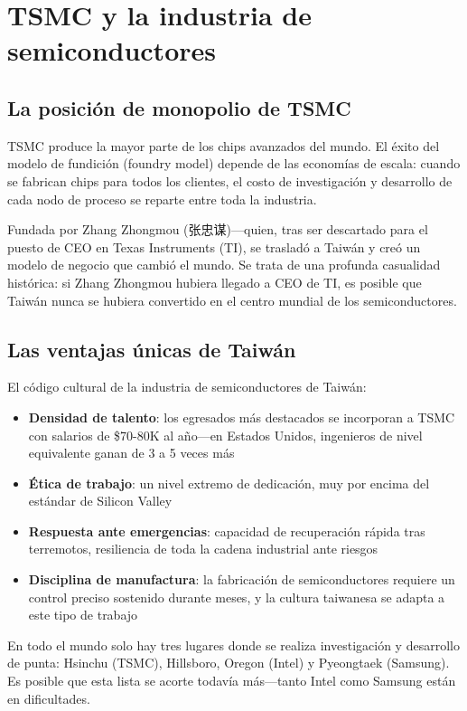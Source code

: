 \section{TSMC y la industria de semiconductores}

\subsection{La posición de monopolio de TSMC}

TSMC produce la mayor parte de los chips avanzados del mundo. El éxito del modelo de fundición (foundry model) depende de las economías de escala: cuando se fabrican chips para todos los clientes, el costo de investigación y desarrollo de cada nodo de proceso se reparte entre toda la industria.

Fundada por Zhang Zhongmou (张忠谋)---quien, tras ser descartado para el puesto de CEO en Texas Instruments (TI), se trasladó a Taiwán y creó un modelo de negocio que cambió el mundo. Se trata de una profunda casualidad histórica: si Zhang Zhongmou hubiera llegado a CEO de TI, es posible que Taiwán nunca se hubiera convertido en el centro mundial de los semiconductores.

\subsection{Las ventajas únicas de Taiwán}

El código cultural de la industria de semiconductores de Taiwán:

\begin{itemize}
    \item \textbf{Densidad de talento}: los egresados más destacados se incorporan a TSMC con salarios de \$70-80K al año---en Estados Unidos, ingenieros de nivel equivalente ganan de 3 a 5 veces más
    \item \textbf{Ética de trabajo}: un nivel extremo de dedicación, muy por encima del estándar de Silicon Valley
    \item \textbf{Respuesta ante emergencias}: capacidad de recuperación rápida tras terremotos, resiliencia de toda la cadena industrial ante riesgos
    \item \textbf{Disciplina de manufactura}: la fabricación de semiconductores requiere un control preciso sostenido durante meses, y la cultura taiwanesa se adapta a este tipo de trabajo
\end{itemize}

En todo el mundo solo hay tres lugares donde se realiza investigación y desarrollo de punta: Hsinchu (TSMC), Hillsboro, Oregon (Intel) y Pyeongtaek (Samsung). Es posible que esta lista se acorte todavía más---tanto Intel como Samsung están en dificultades.

